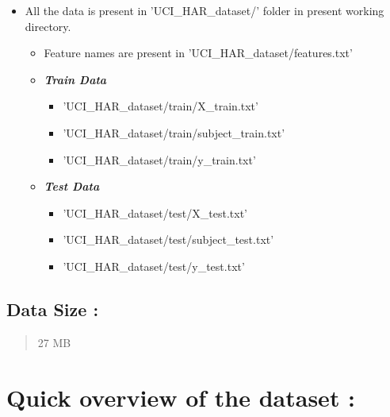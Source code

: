 \documentclass[11pt]{article}
\providecommand{\tightlist}{%
      \setlength{\itemsep}{0pt}\setlength{\parskip}{0pt}}
\begin{document}
\begin{itemize}
\tightlist
\item
  All the data is present in 'UCI\_HAR\_dataset/' folder in present
  working directory.

  \begin{itemize}
  \tightlist
  \item
    Feature names are present in 'UCI\_HAR\_dataset/features.txt'
  \item
    \textbf{\emph{Train Data}}

    \begin{itemize}
    \tightlist
    \item
      'UCI\_HAR\_dataset/train/X\_train.txt'
    \item
      'UCI\_HAR\_dataset/train/subject\_train.txt'
    \item
      'UCI\_HAR\_dataset/train/y\_train.txt'
    \end{itemize}
  \item
    \textbf{\emph{Test Data}}

    \begin{itemize}
    \tightlist
    \item
      'UCI\_HAR\_dataset/test/X\_test.txt'
    \item
      'UCI\_HAR\_dataset/test/subject\_test.txt'
    \item
      'UCI\_HAR\_dataset/test/y\_test.txt'
    \end{itemize}
  \end{itemize}
\end{itemize}

\subsection{Data Size :}\label{data-size}

\begin{quote}
27 MB
\end{quote}

    

    

    

    \section{Quick overview of the dataset
:}\label{quick-overview-of-the-dataset}
\end{document}
